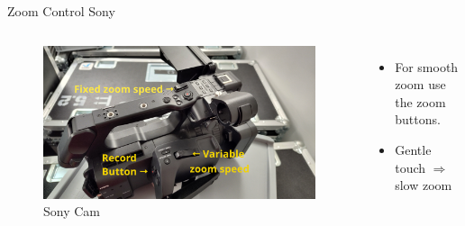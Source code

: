 \begin{frame}{Zoom Control Sony}
	\begin{columns}[T,onlytextwidth]
	\begin{figure}
		\centering
		\includegraphics[width=0.99\textwidth]{images/sony-zoom.jpg}
		\caption{Sony Cam}
	\end{figure}
		\begin{itemize}
			\item For smooth zoom use the zoom buttons.
			\item Gentle touch $\Rightarrow$ slow zoom
		\end{itemize}
	\end{columns}
\end{frame}

